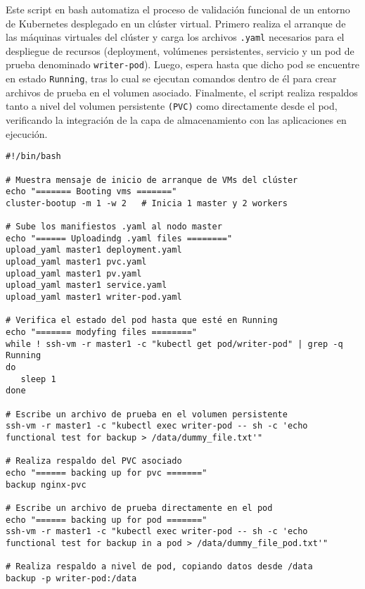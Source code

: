 Este script en bash automatiza el proceso de validación funcional de un entorno de Kubernetes desplegado en un clúster virtual. Primero realiza el arranque de las máquinas virtuales del clúster y carga los archivos \texttt{.yaml} necesarios para el despliegue de recursos (deployment, volúmenes persistentes, servicio y un pod de prueba denominado \texttt{writer-pod}). Luego, espera hasta que dicho pod se encuentre en estado \texttt{Running}, tras lo cual se ejecutan comandos dentro de él para crear archivos de prueba en el volumen asociado. Finalmente, el script realiza respaldos tanto a nivel del volumen persistente \texttt{(PVC)} como directamente desde el pod, verificando la integración de la capa de almacenamiento con las aplicaciones en ejecución.

\begin{verbatim}
#!/bin/bash

# Muestra mensaje de inicio de arranque de VMs del clúster
echo "======= Booting vms ======="
cluster-bootup -m 1 -w 2   # Inicia 1 master y 2 workers

# Sube los manifiestos .yaml al nodo master
echo "====== Uploadindg .yaml files ========"
upload_yaml master1 deployment.yaml
upload_yaml master1 pvc.yaml
upload_yaml master1 pv.yaml
upload_yaml master1 service.yaml
upload_yaml master1 writer-pod.yaml

# Verifica el estado del pod hasta que esté en Running
echo "======= modyfing files ========"
while ! ssh-vm -r master1 -c "kubectl get pod/writer-pod" | grep -q Running 
do
   sleep 1
done

# Escribe un archivo de prueba en el volumen persistente
ssh-vm -r master1 -c "kubectl exec writer-pod -- sh -c 'echo functional test for backup > /data/dummy_file.txt'"

# Realiza respaldo del PVC asociado
echo "====== backing up for pvc ======="
backup nginx-pvc

# Escribe un archivo de prueba directamente en el pod
echo "====== backing up for pod ======="
ssh-vm -r master1 -c "kubectl exec writer-pod -- sh -c 'echo functional test for backup in a pod > /data/dummy_file_pod.txt'"

# Realiza respaldo a nivel de pod, copiando datos desde /data
backup -p writer-pod:/data
\end{verbatim}
